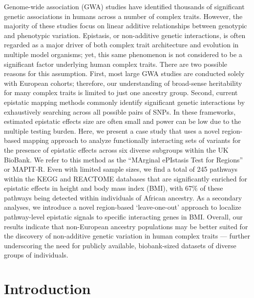 \documentclass[10pt,a4paper]{article}
\begin{document}
Genome-wide association (GWA) studies have identified thousands of significant genetic associations in humans across a number of complex traits. However, the majority of these studies focus on linear additive relationships between genotypic and phenotypic variation. Epistasis, or non-additive genetic interactions, is often regarded as a major driver of both complex trait architecture and evolution in multiple model organisms; yet, this same phenomenon is not considered to be a significant factor underlying human complex traits. There are two possible reasons for this assumption. First, most large GWA studies are conducted solely with European cohorts; therefore, our understanding of broad-sense heritability for many complex traits is limited to just one ancestry group. Second, current epistatic mapping methods commonly identify significant genetic interactions by exhaustively searching across all possible pairs of SNPs. In these frameworks, estimated epistatic effects size are often small and power can be low due to the multiple testing burden. Here, we present a case study that uses a novel region-based mapping approach to analyze functionally interacting sets of variants for the presence of epistatic effects across six diverse subgroups within the UK BioBank. We refer to this method as the ``MArginal ePIstasis Test for Regions'' or MAPIT-R. Even with limited sample sizes, we find a total of 245 pathways within the KEGG and REACTOME databases that are significantly enriched for epistatic effects in height and body mass index (BMI), with 67\% of these pathways being detected within individuals of African ancestry. As a secondary analyses, we introduce a novel region-based `leave-one-out' approach to localize pathway-level epistatic signals to specific interacting genes in BMI. Overall, our results indicate that non-European ancestry populations may be better suited for the discovery of non-additive genetic variation in human complex traits --- further underscoring the need for publicly available, biobank-sized datasets of diverse groups of individuals.

\section*{Introduction}\label{InterPath-Introduction}
\end{document}
